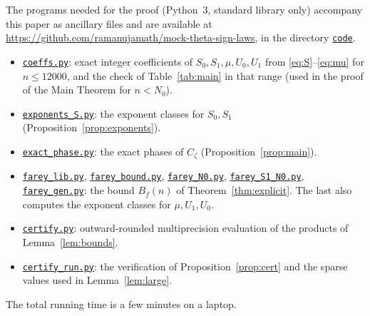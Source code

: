 \documentclass[11pt]{amsart}
\theoremstyle{definition}
\theoremstyle{remark}
\numberwithin{equation}{section}
\begin{document}
The programs needed for the proof (Python~3, standard library only) accompany this paper as ancillary files and are available at \url{https://github.com/ramanujamath/mock-theta-sign-laws}, in the directory \href{https://github.com/ramanujamath/mock-theta-sign-laws/tree/main/code}{\texttt{code}}.
\begin{itemize}
\item \href{https://github.com/ramanujamath/mock-theta-sign-laws/blob/main/code/coeffs.py}{\texttt{coeffs.py}}: exact integer coefficients of $S_0,S_1,\mu,U_0,U_1$ from \eqref{eq:S}--\eqref{eq:mu} for $n\le12000$, and the check of Table~\ref{tab:main} in that range (used in the proof of the Main Theorem for $n<N_0$).
\item \href{https://github.com/ramanujamath/mock-theta-sign-laws/blob/main/code/exponents_S.py}{\texttt{exponents\_S.py}}: the exponent classes for $S_0,S_1$ (Proposition~\ref{prop:exponents}).
\item \href{https://github.com/ramanujamath/mock-theta-sign-laws/blob/main/code/exact_phase.py}{\texttt{exact\_phase.py}}: the exact phases of $C_\zeta$ (Proposition~\ref{prop:main}).
\item \href{https://github.com/ramanujamath/mock-theta-sign-laws/blob/main/code/farey_lib.py}{\texttt{farey\_lib.py}}, \href{https://github.com/ramanujamath/mock-theta-sign-laws/blob/main/code/farey_bound.py}{\texttt{farey\_bound.py}}, \href{https://github.com/ramanujamath/mock-theta-sign-laws/blob/main/code/farey_N0.py}{\texttt{farey\_N0.py}}, \href{https://github.com/ramanujamath/mock-theta-sign-laws/blob/main/code/farey_S1_N0.py}{\texttt{farey\_S1\_N0.py}}, \href{https://github.com/ramanujamath/mock-theta-sign-laws/blob/main/code/farey_gen.py}{\texttt{farey\_gen.py}}: the bound $B_f(n)$ of Theorem~\ref{thm:explicit}. The last also computes the exponent classes for $\mu,U_1,U_0$.
\item \href{https://github.com/ramanujamath/mock-theta-sign-laws/blob/main/code/certify.py}{\texttt{certify.py}}: outward-rounded multiprecision evaluation of the products of Lemma~\ref{lem:bounds}.
\item \href{https://github.com/ramanujamath/mock-theta-sign-laws/blob/main/code/certify_run.py}{\texttt{certify\_run.py}}: the verification of Proposition~\ref{prop:cert} and the sparse values used in Lemma~\ref{lem:large}.
\end{itemize}
The total running time is a few minutes on a laptop.
\end{document}
